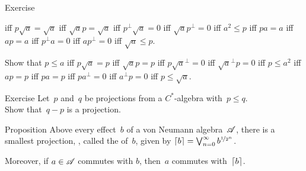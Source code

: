 \documentclass[a]{subfiles}
\begin{document}
\begin{parsec}
\begin{point}{Exercise}
\begin{point}
iff $p\sqrt{a} = \sqrt{a}$
iff $\sqrt{a}p = \sqrt{a}$
iff $p^\perp\sqrt{a} = 0$
iff $\sqrt{a}p^\perp = 0$
iff $a^2\leq p$
iff $p a  = a$
iff $ a p = a $
iff $p^\perp a  = 0$
iff $ap^\perp = 0$
iff $\sqrt{a}\leq p$.
\end{point}
\begin{point}%
Show that $p\leq a$
iff $p \sqrt{a} = p$
iff $\sqrt{a} p = p$
iff $ p\sqrt{a}^\perp = 0$
iff $\sqrt{a}^\perp p = 0$
iff $p\leq a^2$
iff $ap=p$
iff $pa = p$
iff $pa^\perp =0$
iff $a^\perp p =0$
iff $p\leq \sqrt{a}$.
\end{point}
\end{point}
\begin{point}{Exercise}%
Let~$p$ and~$q$ be projections from a $C^*$-algebra
with~$p\leq q$.\\
Show that~$q-p$ is a projection.
\end{point}
\begin{point}{Proposition}%
Above every effect~$b$ of a von Neumann algebra~$\mathscr{A}$,
there is a smallest projection, ,
called the  of~$b$,
 given by $\left\lceil b\right\rceil=\bigvee_{n=0}^\infty b^{\nicefrac{1}{2^n}}$.
\begin{point}%
Moreover, if $a\in \mathscr{A}$ commutes with $b$,
then~$a$ commutes with~$\left\lceil b\right\rceil$.


\end{point}
\end{point}
\end{parsec}
\end{document}

